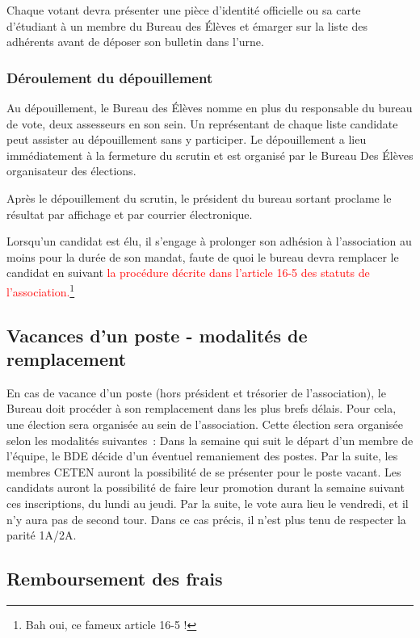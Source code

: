 \documentclass{article} %
\begin{document}
				Chaque votant devra présenter une pièce d’identité officielle ou
				sa carte d’étudiant à un membre du Bureau des Élèves et émarger
				sur la liste des adhérents avant de déposer son bulletin dans
				l’urne.

			\subsubsection{Déroulement du dépouillement}

				Au dépouillement, le Bureau des Élèves nomme en plus du
				responsable du bureau de vote, deux assesseurs en son sein. Un
				représentant de chaque liste candidate peut assister au
				dépouillement sans y participer. Le dépouillement a lieu
				immédiatement à la fermeture du scrutin et est organisé par le
				Bureau Des Élèves organisateur des élections.

				Après le dépouillement du scrutin, le président du bureau
				sortant proclame le résultat par affichage et par courrier
				électronique.

				Lorsqu’un candidat est élu, il s’engage à prolonger son adhésion
				à l’association au moins pour la durée de son mandat, faute de
				quoi le bureau devra remplacer le candidat en suivant
				\textcolor{red}{la procédure décrite dans l’article 16-5 des
				statuts de l’association.}\footnote{Bah oui, ce fameux article
				16-5 !}

		\subsection{Vacances d’un poste - modalités de remplacement}

			En cas de vacance d'un poste (hors président et trésorier de
			l’association), le Bureau doit procéder à son remplacement dans les
			plus brefs délais. Pour cela, une élection sera organisée au sein de
			l'association. Cette élection sera organisée selon les modalités
			suivantes : Dans la semaine qui suit le départ d’un membre de
			l’équipe, le BDE décide d’un éventuel remaniement des postes. Par la
			suite, les membres CETEN auront la possibilité de se présenter pour
			le poste vacant. Les candidats auront la possibilité de faire leur
			promotion durant la semaine suivant ces inscriptions, du lundi au
			jeudi. Par la suite, le vote aura lieu le vendredi, et il n’y aura
			pas de second tour. Dans ce cas précis, il n’est plus tenu de
			respecter la parité 1A/2A.

		\subsection{Remboursement des frais}
\end{document}
